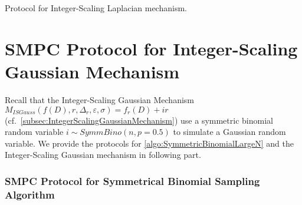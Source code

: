       \begin{protocol}[tbh!]
            \centering
            \caption{\smpc Protocol for Integer-Scaling Laplacian mechanism.}
            \label{prot:ISLap}
      \end{protocol}
      \FloatBarrier




      \section{SMPC Protocol for Integer-Scaling Gaussian Mechanism}
      \label{sec:MPCProtocolforInteger-ScalingGaussianMechanism}
      Recall that the Integer-Scaling Gaussian Mechanism $M_{ISGauss}\left(f\left(D\right),r,\Delta_r,\varepsilon,\sigma\right)=f_r\left(D\right) +ir$ (cf.~\autoref{subsec:IntegerScalingGaussianMechanism}) use a symmetric binomial random variable $i\sim SymmBino\left(n,p=0.5\right)$ to simulate a Gaussian random variable.
      We provide the \smpc protocols for \autoref{algo:SymmetricBinomialLargeN} and the Integer-Scaling Gaussian mechanism in following part.

      \subsubsection{SMPC Protocol for Symmetrical Binomial Sampling Algorithm}
      \label{subsec:MPCProtocolforSymmetricalBinomialSamplingAlgorithm}

